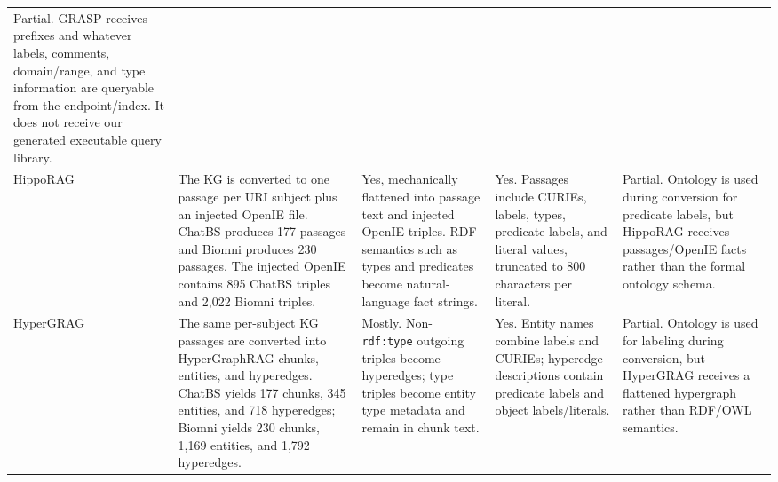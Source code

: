 \begin{table}[t]
\begin{tabular}{@{}p{}p{}p{}p{}p{}@{}}
Partial. GRASP receives prefixes and whatever labels, comments, domain/range, and type information are queryable from the endpoint/index. It does not receive our generated executable query library. \\
\addlinespace
HippoRAG &
The KG is converted to one passage per URI subject plus an injected OpenIE file. ChatBS produces 177 passages and Biomni produces 230 passages. The injected OpenIE contains 895 ChatBS triples and 2,022 Biomni triples. &
Yes, mechanically flattened into passage text and injected OpenIE triples. RDF semantics such as types and predicates become natural-language fact strings. &
Yes. Passages include CURIEs, labels, types, predicate labels, and literal values, truncated to 800 characters per literal. &
Partial. Ontology is used during conversion for predicate labels, but HippoRAG receives passages/OpenIE facts rather than the formal ontology schema. \\
\addlinespace
HyperGRAG &
The same per-subject KG passages are converted into HyperGraphRAG chunks, entities, and hyperedges. ChatBS yields 177 chunks, 345 entities, and 718 hyperedges; Biomni yields 230 chunks, 1,169 entities, and 1,792 hyperedges. &
Mostly. Non-\texttt{rdf:type} outgoing triples become hyperedges; type triples become entity type metadata and remain in chunk text. &
Yes. Entity names combine labels and CURIEs; hyperedge descriptions contain predicate labels and object labels/literals. &
Partial. Ontology is used for labeling during conversion, but HyperGRAG receives a flattened hypergraph rather than RDF/OWL semantics. \\
\bottomrule
\end{tabular}
\end{table}

